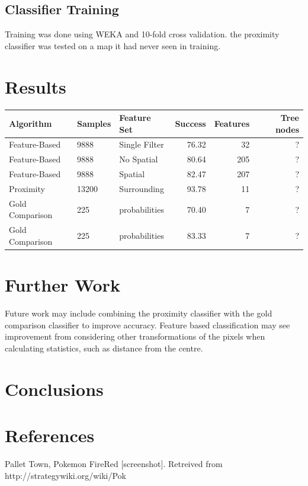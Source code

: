 \documentclass[preprint,3p,12pt]{elsarticle}
\begin{document}
\subsection{Classifier Training}
\label{process:training}
Training was done using WEKA and 10-fold cross validation.
the proximity classifier was tested on a map it had never seen in training.

\section{Results}
\label{results}

\begin{tabular}{lllrrr}
Algorithm & Samples & Feature Set & Success & Features & Tree nodes \\\hline
Feature-Based & 9888 & Single Filter &  76.32 & 32  & ? \\
Feature-Based & 9888 & No Spatial &  80.64 & 205 & ? \\
Feature-Based & 9888 & Spatial &  82.47 & 207 & ? \\
Proximity & 13200 & Surrounding & 93.78 & 11 & ? \\ 
Gold Comparison & 225 & probabilities & 70.40 & 7 & ? \\
Gold Comparison & 225 & probabilities & 83.33 & 7 & ? \\
\end{tabular}

\section{Further Work}
\label{further work}
Future work may include combining the proximity classifier with the gold 
comparison classifier to improve accuracy. Feature based classification may
see improvement from considering other transformations of the pixels when
calculating statistics, such as distance from the centre.

\section{Conclusions}
\label{conclusions}


\section{References}
\label{references}
Pallet Town, Pokemon FireRed [screenshot]. Retreived from http://strategywiki.org/wiki/Pok%
\end{document}
